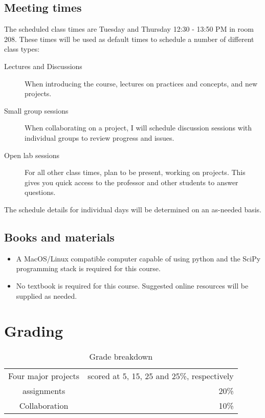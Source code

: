 \documentclass[12pt]{article}
\begin{document}
\subsection*{Meeting times}

The scheduled class times are Tuesday and Thursday 12:30 - 13:50 PM in room 208. These times will be used as default times to schedule a number of different class types:
\begin{description}
\item[Lectures and Discussions] When introducing the course, lectures on practices and concepts, and new projects.
\item[Small group sessions] When collaborating on a project, I will schedule discussion sessions with individual groups to review progress and issues.
\item[Open lab sessions] For all other class times, plan to be present, working on projects. This gives you quick access to the professor and other students to answer questions.

\end{description}
The schedule details for individual days will be determined on an as-needed basis.

\subsection*{Books and materials}

\begin{itemize}
\item A MacOS/Linux compatible computer capable of using python and the SciPy programming stack is required for this course.
\item No textbook is required for this course. Suggested online resources will be supplied as needed.
\end{itemize}

\section*{Grading}

\begin{table}[h]
  \caption{Grade breakdown}
\begin{center}
  \begin{tabular}{cr}
	\toprule
    Four major projects & scored at 5, 15, 25 and 25\%, respectively \\
    assignments & 20\% \\
    Collaboration & 10\% \\
    \bottomrule
  \end{tabular}
\end{center}
\end{table}
\end{document}
